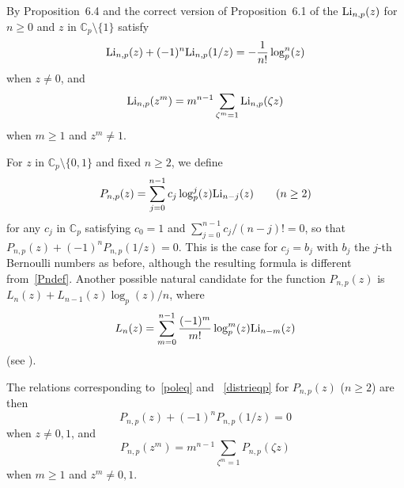 \documentclass{amsart}
\begin{document}
By Proposition~6.4 and the correct version of Proposition~6.1 of \cite{Col82} the $ {\textup{Li}}_{n,p}(z) $
for $ n \ge 0 $ and $ z $ in $ {{\mathbb C_p}}\setminus\{1\} $ satisfy
\begin{equation*}
{\textup{Li}}_{n,p}(z) + (-1)^n {\textup{Li}}_{n,p}(1/z) = -\frac{1}{n!} \log_p^n(z)
\end{equation*}
when $ z \ne 0 $, and
\begin{equation}\label{distrieqp}
{\textup{Li}}_{n,p}(z^m) = m^{n-1} \sum_{{\zeta}^m=1} {\textup{Li}}_{n,p}({\zeta} z)
\end{equation}
when $ m \ge 1 $ and $ z^m \ne 1 $.

For $ z $ in $ {{\mathbb C_p}}\setminus\{0,1\} $ and fixed $ n \ge 2 $, we define
\begin{equation}\label{Pnpdef}
{P_{n,p}}(z) = \sum_{j=0}^{n-1} c_j \log_p^j(z) {\textup{Li}}_{n-j}(z)
\qquad (n \ge 2)
\end{equation}
for any $ c_j $ in $ {{\mathbb C_p}} $ satisfying $ c_0=1 $ and $ \sum_{j=0}^{n-1} c_j/(n-j)! =0 $, so 
that $ {P_{n,p}}(z) + (-1)^n {P_{n,p}}(1/z) = 0 $.
This is the case for $ c_j=b_j $
with $ b_j $ the $ j $-th Bernoulli numbers as before, although
the resulting formula is different from~\eqref{Pndef}.
Another possible natural candidate for the function ${P_{n,p}}(z)$ is $
L_n(z) + L_{n-1}(z) \log_p(z)/n$, where
\begin{equation*}
  L_n(z) = \sum_{m=0}^{n-1} \frac{(-1)^m}{m!} \log_p^m(z) {\textup{Li}}_{n-m}(z) 
\end{equation*}
(see \cite[(1.3) and Remark~1.5]{BdJ03}).

The relations corresponding to~\eqref{poleq} and ~\eqref{distrieqp} for $ {P_{n,p}}(z) $ ($ n\ge2 $)
are then
\begin{equation*}
{P_{n,p}}(z) + (-1)^n {P_{n,p}}(1/z) = 0
\end{equation*}
when $ z\ne 0,1 $, and
\begin{equation}\label{distrieqpLmod}
{P_{n,p}}(z^m) = m^{n-1} \sum_{{\zeta}^m=1} {P_{n,p}}({\zeta} z)
\end{equation}
when $ m \ge 1 $ and $ z^m \ne 0,1 $.
\end{document}
